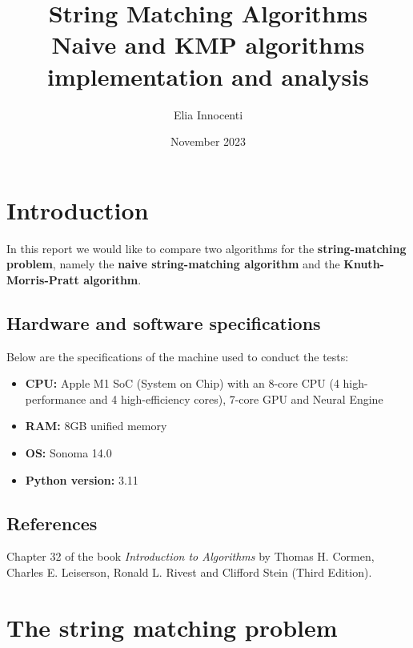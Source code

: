 \documentclass[11pt]{article}
\title{String Matching Algorithms \\
       \vspace{0.5em}
       \large Naive and KMP algorithms implementation and analysis}
\author{Elia Innocenti}
\date{November 2023}
\begin{document}

    \maketitle
    \tableofcontents

    \restoregeometry

    \newpage

    \section{Introduction} \label{sec:introduction}

        In this report we would like to compare two algorithms for the \textbf{string-matching problem}, namely the \textbf{naive string-matching algorithm} and the \textbf{Knuth-Morris-Pratt algorithm}.

        \subsection{Hardware and software specifications} \label{subsec:hardware_software}

            Below are the specifications of the machine used to conduct the tests:
            \begin{itemize}
                \item \textbf{CPU:} Apple M1 SoC (System on Chip) with an 8-core CPU (4 high-performance and 4 high-efficiency cores), 7-core GPU and Neural Engine
                \item \textbf{RAM:} 8GB unified memory
                \item \textbf{OS:} Sonoma 14.0
                \item \textbf{Python version:} 3.11
            \end{itemize}

        \subsection{References} \label{subsec:references}

            Chapter 32 of the book \textit{Introduction to Algorithms} by Thomas H. Cormen, Charles E. Leiserson, Ronald L. Rivest and Clifford Stein (Third Edition).

    \section{The string matching problem} \label{sec:string_matching_problem}
\end{document}
